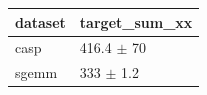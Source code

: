 \begin{tabular}{ll}
\toprule
dataset & target\_sum\_xx \\
\midrule
casp & 416.4 $\pm$ 70 \\
sgemm & 333 $\pm$ 1.2 \\
\bottomrule
\end{tabular}
